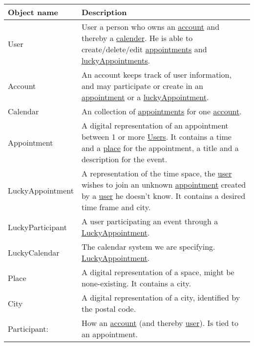 {\tabulinesep=1.2mm
\begin{tabu}{ | p{3cm} | p{13cm} |}\hline
    Object name 			& 		Description\\\hline
    User  					& 		User a person who owns an \uline{account} and thereby a \uline{calender}. He is able to create/delete/edit \uline{appointments} and  \uline{luckyAppointments}. \\\hline
    Account 				& 		An account keeps track of user information, and may participate or create in an \uline{appointment} or a \uline{luckyAppointment}. \\\hline
	Calendar				&		An collection of \uline{appointments} for one \uline{account}.\\ \hline
	Appointment				&		A digital representation of an appointment between 1 or more \uline{Users}. It contains a time and a \uline{place} for the appointment, a title and a description for the event.\\\hline
	LuckyAppointment		&		A representation of the time space, the \uline{user} wishes to join an unknown \uline{appointment} created by a \uline{user} he doesn't know. It contains a desired time frame and city.\\\hline
	LuckyParticipant		&		A user participating an event through a \uline{LuckyAppointment}.\\\hline
	LuckyCalendar			&		The calendar system we are specifying. \uline{LuckyAppointment}.\\\hline
    Place 					& 		A digital representation of a space, might be none-existing. It contains a city.\\\hline
    City 					& 		A digital representation of a city, identified by the postal code.\\\hline
	Participant: 			&		How an \uline{account} (and thereby \uline{user}). Is tied to an appointment.\\\hline
\end{tabu}
}